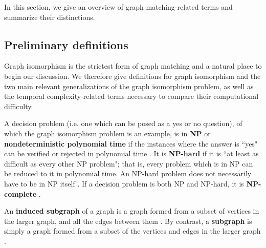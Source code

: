\documentclass[12pt]{thesis}
\theoremstyle{plain}
\theoremstyle{definition}
\theoremstyle{remark}
\begin{document}
In this section, we give an overview of graph matching-related terms and summarize their distinctions.

\subsection{Preliminary definitions}

Graph isomorphism is the strictest form of graph matching and a natural place to begin our discussion. We therefore give definitions for graph isomorphism and the two main relevant generalizations of the graph isomorphism problem, as well as the temporal complexity-related terms necessary to compare their computational difficulty.

A decision problem (i.e. one which can be posed as a yes or no question), of which the graph isomorphism problem is an example, is in \textbf{NP} or \textbf{nondeterministic polynomial time} if the instances where the answer is ``yes" can be verified or rejected in polynomial time \cite{Hartmanis_1982,wikiNPComplexity}. It is \textbf{NP-hard} if it is ``at least as difficult as every other NP problem"; that is, every problem which is in NP can be reduced to it in polynomial time. An NP-hard problem does not necessarily have to be in NP itself  \cite{Hartmanis_1982,wikiNPHardness}. If a decision problem is both NP and NP-hard, it is \textbf{NP-complete} \cite{Hartmanis_1982,wikiNPCompleteness}.

An \textbf{induced subgraph} of a graph is a graph formed from a subset of vertices in the larger graph, and all the edges between them \cite{wikiInducedSubgraph}. By contrast, a \textbf{subgraph} is simply a graph formed from a subset of the vertices and edges in the larger graph \cite{wikiSubgraph}.
\end{document}
